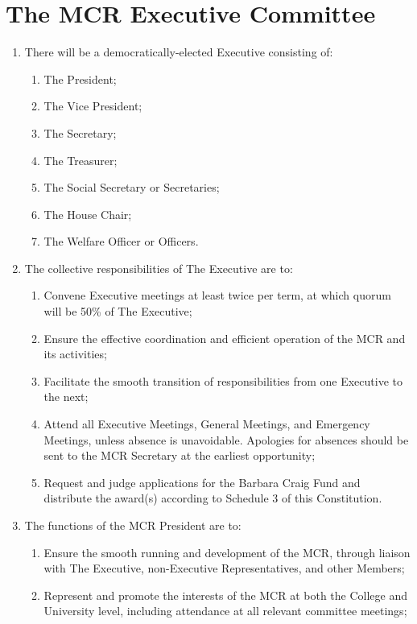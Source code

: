 \documentclass[11pt, a4paper]{article}
\begin{document}
\section{The MCR Executive Committee}
\label{sec:executive}


\begin{enumerate}
    \item There will be a democratically-elected Executive consisting of:
    \begin{enumerate}
        \item The President;
        \item The Vice President;
        \item The Secretary;
        \item The Treasurer;
        \item The Social Secretary or Secretaries;
        \item The House Chair;
        \item The Welfare Officer or Officers.
    \end{enumerate}
    \item The collective responsibilities of The Executive are to:
    \begin{enumerate}
        \item Convene Executive meetings at least twice per term, at which quorum will be 50\% of The Executive;
        \item Ensure the effective coordination and efficient operation of the MCR and its activities;
        \item Facilitate the smooth transition of responsibilities from one Executive to the next;
        \item Attend all Executive Meetings, General Meetings, and Emergency Meetings, unless absence is unavoidable. Apologies for absences should be sent to the MCR Secretary at the earliest opportunity;
        \item Request and judge applications for the Barbara Craig Fund and distribute the award(s) according to Schedule 3 of this Constitution.
    \end{enumerate}
    \item The functions of the MCR President are to:
    \begin{enumerate}
        \item Ensure the smooth running and development of the MCR, through liaison with The Executive, non-Executive Representatives, and other Members;
        \item Represent and promote the interests of the MCR at both the College and University level, including attendance at all relevant committee meetings;

\end{enumerate}
\end{enumerate}
\end{document}
